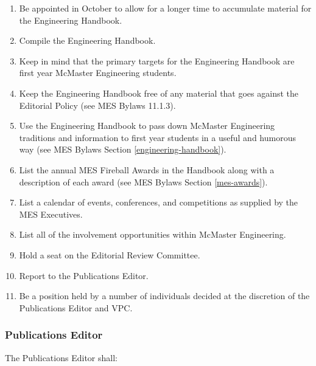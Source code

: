 \begin{enumerate}
 \item
  Be appointed in October to allow for a longer time to accumulate material for the Engineering Handbook.
 \item
  Compile the Engineering Handbook.
 \item
  Keep in mind that the primary targets for the Engineering Handbook are first year McMaster Engineering students.
 \item
  Keep the Engineering Handbook free of any material that goes against the Editorial Policy (see MES Bylaws 11.1.3).
 \item
  Use the Engineering Handbook to pass down McMaster Engineering traditions and information to first year students in a useful and humorous way (see MES Bylaws Section \ref{engineering-handbook}).
 \item
  List the annual MES Fireball Awards in the Handbook along with a description of each award (see MES Bylaws Section \ref{mes-awards}).
 \item
  List a calendar of events, conferences, and competitions as supplied by the MES Executives.
 \item
  List all of the involvement opportunities within McMaster Engineering.
 \item
  Hold a seat on the Editorial Review Committee. 
 \item    
  Report to the Publications Editor.
 \item
  Be a position held by a number of individuals decided at the discretion of the Publications Editor and VPC.

\end{enumerate}

\subsubsection{Publications Editor}
\label{publications-editor}
The Publications Editor shall:

